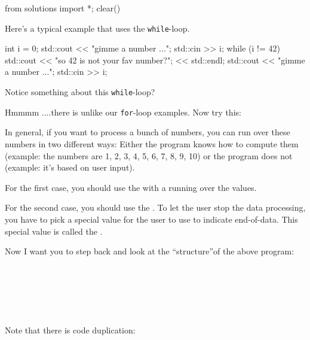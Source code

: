 \begin{python0}
from solutions import *; clear()
\end{python0}

Here's a typical example that uses the \texttt{while}-loop.
\begin{console}
int i = 0;
std::cout << "gimme a number ...";
std::cin >> i;
while (i != 42)
{     
      std::cout << "so 42 is not your fav number?";
                << std::endl;
      std::cout << "gimme a number ...";
      std::cin >> i;
}
\end{console}

Notice something about this \texttt{while}-loop?

Hmmmm ....there is  unlike our \texttt{for}-loop examples. Now try this:

In general, if you want to process a bunch of numbers, you can run over
these numbers in two different ways: Either the program knows how to
compute them (example: the numbers are 1, 2, 3, 4, 5, 6, 7, 8, 9, 10) or
the program does not (example: it's based on user
input).

For the first case, you should use the  with a
 running over the values.

For the second case, you should use the . To let the
user stop the data processing, you have to pick a special value for the
user to use to indicate end-of-data. This special value is called the
.

Now I want you to step back and look at the ``structure''of the above
program:

\\
\\
\\
\\
\\

Note that there is code duplication:

\\
\\
\\
\\
\\




